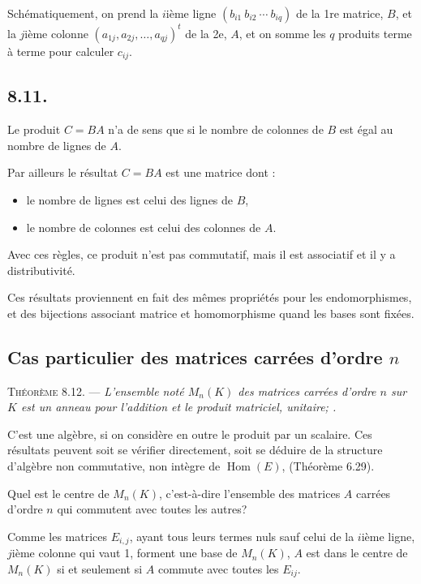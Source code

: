 Schématiquement, on prend la $i$ième ligne $(b_{i1}\ b_{i2}\ \cdots\ b_{iq})$ de la 1re matrice, $B$, et la $j$ième colonne $(a_{1j},a_{2j},\ldots,a_{qj})^t$ de la 2e, $A$, et on somme les $q$ produits terme à terme pour calculer $c_{ij}$.

\subsection*{8.11.}
Le produit $C=BA$ n'a de sens que si le nombre de colonnes de $B$ est égal au nombre de lignes de $A$.

Par ailleurs le résultat $C=BA$ est une matrice dont :
\begin{itemize}[leftmargin=2em]
\item le nombre de lignes est celui des lignes de $B$,
\item le nombre de colonnes est celui des colonnes de $A$.
\end{itemize}
Avec ces règles, ce produit n'est pas commutatif, mais il est associatif et il y a distributivité.

Ces résultats proviennent en fait des mêmes propriétés pour les endomorphismes, et des bijections associant matrice et homomorphisme quand les bases sont fixées.

\subsection*{Cas particulier des matrices carrées d'ordre $n$}

\medskip\noindent\textsc{Théorème 8.12.} --- \emph{L'ensemble noté $M_n(K)$ des matrices carrées d'ordre $n$ sur $K$ est un anneau pour l'addition et le produit matriciel, unitaire; .}

C'est une algèbre, si on considère en outre le produit par un scalaire. Ces résultats peuvent soit se vérifier directement, soit se déduire de la structure d'algèbre non commutative, non intègre de $\operatorname{Hom}(E)$, (Théorème 6.29). \bookend

Quel est le centre de $M_n(K)$, c'est-à-dire l'ensemble des matrices $A$ carrées d'ordre $n$ qui commutent avec toutes les autres?

Comme les matrices $E_{i,j}$, ayant tous leurs termes nuls sauf celui de la $i$ième ligne, $j$ième colonne qui vaut 1, forment une base de $M_n(K)$, $A$ est dans le centre de $M_n(K)$ si et seulement si $A$ commute avec toutes les $E_{ij}$.

